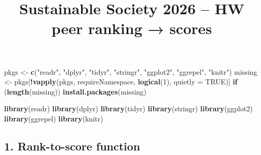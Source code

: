 \documentclass[
]{article}
\title{Sustainable Society 2026 -- HW peer ranking → scores}
\author{}
\date{\vspace{-2.5em}}
\newenvironment{Shaded}{\begin{snugshade}}{\end{snugshade}}
\newcommand{\AttributeTok}[1]{\textcolor[rgb]{0.13,0.29,0.53}{#1}}
\newcommand{\ConstantTok}[1]{\textcolor[rgb]{0.56,0.35,0.01}{#1}}
\newcommand{\ControlFlowTok}[1]{\textcolor[rgb]{0.13,0.29,0.53}{\textbf{#1}}}
\newcommand{\DecValTok}[1]{\textcolor[rgb]{0.00,0.00,0.81}{#1}}
\newcommand{\FunctionTok}[1]{\textcolor[rgb]{0.13,0.29,0.53}{\textbf{#1}}}
\newcommand{\NormalTok}[1]{#1}
\newcommand{\OtherTok}[1]{\textcolor[rgb]{0.56,0.35,0.01}{#1}}
\newcommand{\SpecialCharTok}[1]{\textcolor[rgb]{0.81,0.36,0.00}{\textbf{#1}}}
\newcommand{\StringTok}[1]{\textcolor[rgb]{0.31,0.60,0.02}{#1}}
\begin{document}
\maketitle

{
\setcounter{tocdepth}{2}
\tableofcontents
}
\begin{Shaded}
\begin{Highlighting}[]
\NormalTok{pkgs }\OtherTok{\textless{}{-}} \FunctionTok{c}\NormalTok{(}\StringTok{"readr"}\NormalTok{, }\StringTok{"dplyr"}\NormalTok{, }\StringTok{"tidyr"}\NormalTok{, }\StringTok{"stringr"}\NormalTok{, }\StringTok{"ggplot2"}\NormalTok{, }\StringTok{"ggrepel"}\NormalTok{, }\StringTok{"knitr"}\NormalTok{)}
\NormalTok{missing }\OtherTok{\textless{}{-}}\NormalTok{ pkgs[}\SpecialCharTok{!}\FunctionTok{vapply}\NormalTok{(pkgs, requireNamespace, }\FunctionTok{logical}\NormalTok{(}\DecValTok{1}\NormalTok{), }\AttributeTok{quietly =} \ConstantTok{TRUE}\NormalTok{)]}
\ControlFlowTok{if}\NormalTok{ (}\FunctionTok{length}\NormalTok{(missing)) }\FunctionTok{install.packages}\NormalTok{(missing)}

\FunctionTok{library}\NormalTok{(readr)}
\FunctionTok{library}\NormalTok{(dplyr)}
\FunctionTok{library}\NormalTok{(tidyr)}
\FunctionTok{library}\NormalTok{(stringr)}
\FunctionTok{library}\NormalTok{(ggplot2)}
\FunctionTok{library}\NormalTok{(ggrepel)}
\FunctionTok{library}\NormalTok{(knitr)}
\end{Highlighting}
\end{Shaded}

\subsection{1. Rank-to-score function}\label{rank-to-score-function}
\end{document}

